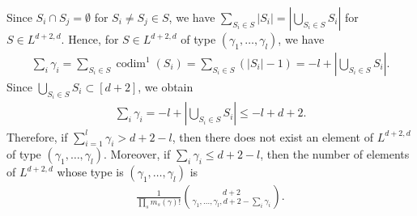 \documentclass{wstmp}
\begin{document}
Since $S_i \cap S_j =\emptyset$ for $S_i\neq S_j\in S$,
we have $\sum_{S_i\in S} {\left|{S_i}\right|}={\left|{\bigcup_{S_i\in S} S_i}\right|}$ 
for $S\in L^{d+2,d}$.
Hence,
for $S \in L^{d+2,d}$ of type $(\gamma_1,\ldots,\gamma_l)$,
we have
\begin{align*}
 \sum_i \gamma_i
 = \sum_{S_i  \in S} {\operatorname{codim}}^1 (S_i)
 = \sum_{S_i  \in S} ({\left|{S_i}\right|}-1)
 = -l+{\left|{\bigcup_{S_i  \in S} S_i}\right|}.
\end{align*}
Since $\bigcup_{S_i  \in S} S_i \subset [d+2]$, we obtain
\begin{align*}
 \sum_i \gamma_i = -l+{\left|{\bigcup_{S_i  \in S} S_i}\right|} \leq -l+d+2.
\end{align*}
Therefore,
 if $\sum_{i=1}^{l} \gamma_i > d+2-l$,
then there does not exist
 an element of $L^{d+2,d}$ of type $(\gamma_1,\ldots,\gamma_l)$.
 Moreover, if $\sum_i \gamma_i \leq d+2-l$,
 then the number of 
 elements of $L^{d+2,d}$
 whose type is $(\gamma_1,\ldots,\gamma_l)$
 is
 \begin{align*}
 \frac{1}{\prod_s m_s(\gamma)!}\binom{d+2}{\gamma_1,\ldots,\gamma_l,d+2-\sum_i \gamma_i }.
 \end{align*}
\end{document}
